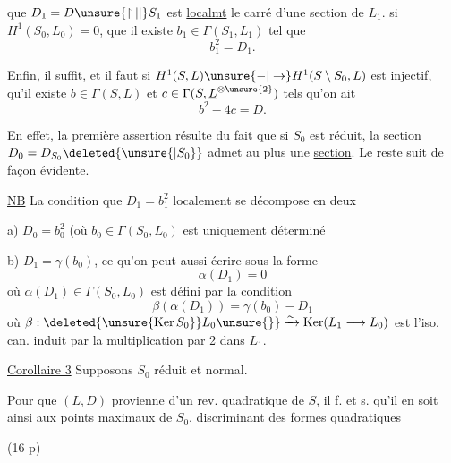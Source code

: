 que $D_1=D\unsure{\upharpoonright|\vert}S_1$  est \uline{localmt} le carré d'une section de $L_1$.  si $H^1(S_0,L_0)=0$,  que  il existe $b_1\in\Gamma(S_1,L_1)$ tel que
\[b_1^2=D_1.\]

Enfin, il suffit, et il faut si $H^1(S,L)\unsure{-|\to}H^1(S\setminus S_0,L)$ est injectif, qu'il existe $b\in\Gamma(S,\underline L)$ et $c\in\Gamma(S,\underline L^{\otimes\unsure{2}})$ tels qu'on ait
\[b^2-4c=D.\]

En effet, la première assertion résulte du fait que si $S_0$ est réduit, la section $D_0=D_{S_0}\deleted{\unsure{|S_0}}$ admet au plus une \uline{section}. Le reste suit de façon évidente.

\uline{NB} La condition que $D_1=b_1^2$ localement se décompose en deux

a) $D_0=b_0^2$ (où $b_0\in\Gamma(S_0,L_0)$ est uniquement déterminé 

b) $D_1=\gamma(b_0)$, ce qu'on peut aussi écrire sous la forme
\[\alpha(D_1)=0\]
où $\alpha(D_1)\in\Gamma(S_0,L_0)$ est défini par la condition
\[\beta(\alpha(D_1))=\gamma(b_0)-D_1\]
où $\beta:\deleted{\unsure{\operatorname{Ker} S_0}}L_0\unsure{\}}\xrightarrow{\sim}\operatorname{Ker}(L_1\longrightarrow L_0)$
est l'iso. can. induit par la multiplication par 2 dans $L_1$.

\uline{Corollaire 3} Supposons $S_0$ réduit et normal.

Pour que $(L,D)$ provienne d'un rev. quadratique de $S$, il f. et s. qu'il en soit ainsi aux points  maximaux de $S_0$.
discriminant des formes quadratiques

(16 p)
